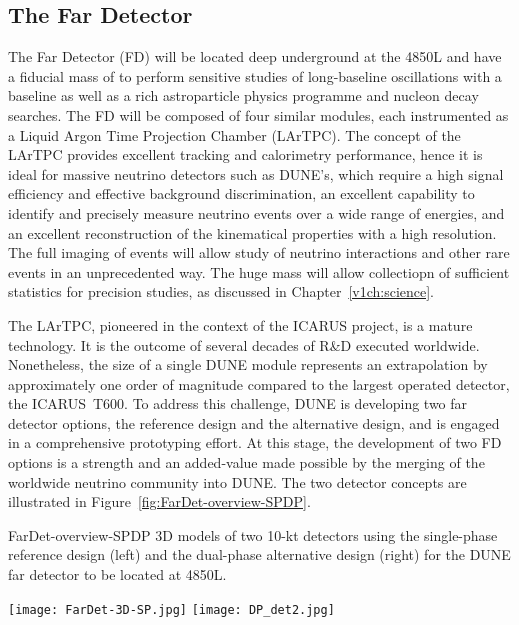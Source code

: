 \subsection{The Far Detector}
The  Far Detector (FD) will be located deep underground at the 4850L and have
a  fiducial mass of  to perform sensitive studies of long-baseline oscillations with a  baseline as well as a rich astroparticle physics programme and nucleon decay searches. The FD  will be composed of four %
similar modules, each instrumented as a Liquid Argon Time Projection Chamber (LArTPC).
The concept of the LArTPC provides
excellent tracking and calorimetry performance, hence it is ideal for massive neutrino detectors such as DUNE's, which require a high signal efficiency and effective background discrimination,  an excellent capability to identify and  precisely measure neutrino events over a wide range of energies, and an excellent reconstruction of the kinematical properties
with a high resolution. The full imaging of events will allow study of neutrino interactions and
other rare events in an unprecedented way. 
 The huge mass will allow collectiopn of sufficient statistics for precision
studies, as discussed in Chapter~\ref{v1ch:science}.

The LArTPC, pioneered in the context of the ICARUS project, is a mature technology. It is the outcome
of several decades of R\&D executed worldwide.  Nonetheless, the size of a single  DUNE module represents an extrapolation by approximately one order of magnitude compared to the largest operated detector, the ICARUS~T600. To address this challenge, DUNE is developing two far detector options, the reference design and the alternative design, and is engaged in a 
comprehensive prototyping effort. At this stage, the development of two FD options is a strength and an added-value 
made possible by the merging of the worldwide neutrino community into DUNE.  The two detector
concepts are illustrated in Figure~\ref{fig:FarDet-overview-SPDP}.

\begin{cdrfigure}{FarDet-overview-SPDP}
{3D models of two 10-kt detectors using the single-phase reference design (left) 
and the dual-phase alternative design (right) for the DUNE far detector to be 
located at 4850L.}
\centering
\begin{minipage}[b]{1.0\textwidth}
\begin{center}
\texttt{[image: FarDet-3D-SP.jpg]}
\texttt{[image: DP\_det2.jpg]}
\end{center}
\end{minipage}
\end{cdrfigure}



